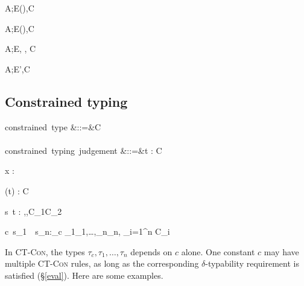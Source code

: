 \documentclass{amsart}
\theoremstyle{definition}
\begin{document}

{A;E\vdash(\All\alpha\sigma)\Sub\tau,C}

{A;E\vdash\sigma\Sub(\All\alpha\tau),C}

{A;E\vdash \sigma\Sub\tau, \sigma\Sub\tau, C}


{A;E\vdash \sigma\Sub\tau',C}

\subsection{Constrained typing}
\begin{syntax}
\mbox{constrained type}
&::=&\tau \Given C
\\\\
\mbox{constrained typing judgement}
&::=&\Gamma \vdash t : \tau \Given C
\end{syntax}%
{\Gamma\vdash x : \tau \Given \emptyset}

{\Gamma\vdash (t) : \sigma\R\tau \Given C}

{\Gamma\vdash s~t : \beta \Given
\sigma\Sub\alpha\R\beta,\tau\Sub\alpha,C_1\cup C_2}

{\Gamma\vdash c~s_1~\cdots~s_n:\tau_c\Given
\sigma_1\Sub\tau_1,\ldots,\sigma_n\Sub\tau_n,
{\textstyle\bigcup_{i=1}^n C_i}
}

In \textsc{CT-Con}, the types $\tau_c,\tau_1,\ldots,\tau_n$
depends on $c$ alone. One constant $c$ may have multiple
\textsc{CT-Con} rules, as long as the corresponding
$\delta$-typability requirement is satisfied
(\S\ref{eval}). Here are some examples.
\end{document}
